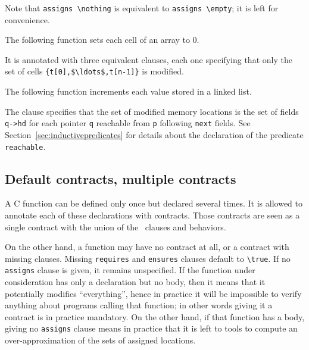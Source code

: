 Note that \lstinline|assigns \nothing| is equivalent to
\lstinline|assigns \empty|; it is left for convenience.

\begin{example}
  The following function sets each cell of an array to 0.

%
  It is annotated with three equivalent \assigns{} clauses, each one
  specifying that only the set of cells
  \lstinline|{t[0],$\ldots$,t[n-1]}|
  is modified.
\end{example}

\begin{example}
  \label{ex:locations-list}
  The following function increments each value stored in a linked
  list.

%
  The \assigns{} clause specifies that the set of modified memory
  locations is the set of fields \lstinline|q->hd| for each pointer
  \lstinline|q|
  reachable from \lstinline|p| following \lstinline|next| fields. See
  Section~\ref{sec:inductivepredicates} for details about the
  declaration of the predicate \texttt{reachable}.
\end{example}

\subsection{Default contracts, multiple contracts}
\label{sec:multiplecontracts}

A C function can be defined only once but declared several times.
It is allowed to annotate each of these declarations with contracts.
Those contracts are seen as a single contract with the union of the
\requires\ clauses and behaviors.

On the other hand, a function may have no contract at all, or a
contract with missing clauses. Missing \lstinline|requires| and
\lstinline|ensures| clauses default to \lstinline!\true!.
If no \lstinline|assigns| clause is given, it remains unspecified. If the
function under consideration has only a declaration but no body, then
it means that it potentially modifies ``everything'', hence in practice
it will be impossible to verify anything about programs calling that
function; in other words giving it a contract is in practice
mandatory. On the other hand, if that function has a body, giving no
\lstinline|assigns| clause means in practice that it is left to tools to
compute an over-approximation of the sets of assigned locations.

